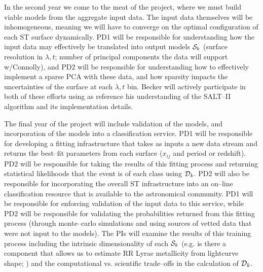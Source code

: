 In the second year we come to the meat of the project, where we must build
viable models from the aggregate input data.  The input data themselves will be
inhomogeneous, meaning we will have to converge on the optimal configuration of
each ST surface dynamically. PD1 will be responsible for understanding how the
input data may effectively be translated into output models ${\cal S}_k$
(surface resolution in $\lambda, t$; number of principal components the data
will support w/Connolly), and PD2 will be responsible for understanding how to
effectively implement a sparse PCA with these data, and how sparsity impacts the
uncertainties of the surface at each $\lambda, t$ bin. Becker will actively
participate in both of these efforts using as reference his understanding of the
SALT--II algorithm and its implementation details.


 \smallskip

The final year of the project will include validation of the models, and
incorporation of the models into a classification service.  PD1 will be
responsible for developing a fitting infrastructure that takes as inputs a new
data stream and returns the best--fit parameters from each surface ($x_{ij}$ and
period or redshift).  PD2 will be responsible for taking the results of this
fitting process and returning statistical likelihoods that the event is of each
class using ${\cal D}_k$.  PD2 will also be responsible for incorporating the
overall ST infrastructure into an on--line classification resource that is
available to the astronomical community. PD1 will be responsible for enforcing
validation of the input data to this service, while PD2 will be responsible for
validating the probabilities returned from this fitting process (through
monte--carlo simulations and using sources of vetted data that were not input to
the models). The PIs will examine the results of this training process including
the intrinsic dimensionality of each ${\cal S}_k$ (e.g. is there a component
that allows us to estimate RR Lyrae metallicity from lightcurve shape;
\citealt{1996A&A...312..111J}) and the computational vs. scientific trade--offs
in the calculation of ${\cal D}_k$.

